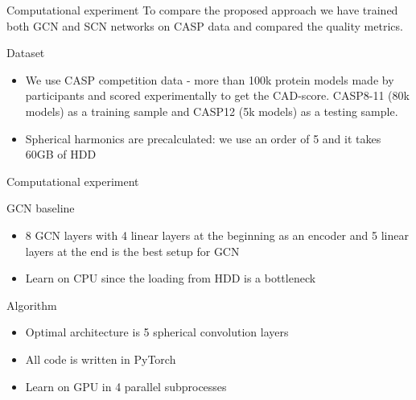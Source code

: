\documentclass{beamer}
\begin{document}
\begin{frame}{Computational experiment}
    To compare the proposed approach we have trained both GCN and SCN networks on CASP data and compared the quality metrics.
    \begin{block}{Dataset}
        \begin{itemize}
            \item We use CASP competition data - more than 100k protein models made by participants and scored experimentally to get the CAD-score. CASP8-11 (80k models) as a training sample and CASP12 (5k models) as a testing sample.
            \item Spherical harmonics are precalculated: we use an order of 5 and it takes 60GB of HDD
        \end{itemize}
    \end{block}
    
\end{frame}
\begin{frame}{Computational experiment}
    \begin{block}{GCN baseline}
        \begin{itemize}
            \item 8 GCN layers with 4 linear layers at the beginning as an encoder and 5 linear layers at the end is the best setup for GCN
            \item Learn on CPU since the loading from HDD is a bottleneck
        \end{itemize}
    \end{block}
    \begin{block}{Algorithm}
        \begin{itemize}
            \item Optimal architecture is 5 spherical convolution layers
            \item All code is written in PyTorch
            \item Learn on GPU in 4 parallel subprocesses
        \end{itemize}
    \end{block}
\end{frame}
\end{document}

